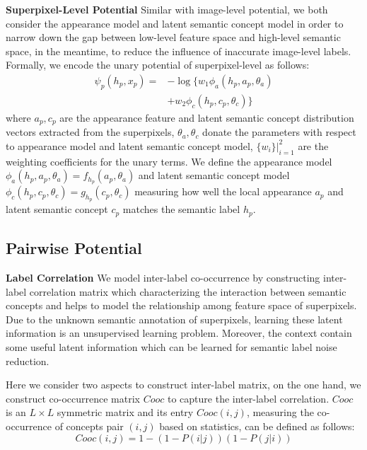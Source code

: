 \textbf{Superpixel-Level Potential}
Similar with image-level potential, we both consider the appearance model and latent semantic concept model in order to narrow down the gap between low-level feature space and high-level semantic space, in the meantime, to reduce the influence of inaccurate image-level labels.
Formally, we encode the unary potential of superpixel-level as follows:
\begin{equation}
    \begin{aligned}
        \psi_{p}(h_p,x_p) = &- \log \big\{ w_1\phi_a(h_p,a_p,\theta_a) \\
        &+ w_2\phi_c(h_p,c_p,\theta_c) \big\}
    \end{aligned}
    \label{eq:local}
\end{equation}
where $a_p, c_p$ are the appearance feature and latent semantic concept distribution vectors extracted from the superpixels, $\theta_a, \theta_c$ donate the parameters with respect to appearance model and latent semantic concept model, $\{w_i\}|_{i=1}^2$ are the weighting coefficients for the unary terms.
We define the appearance model $\phi_a(h_p,a_p,\theta_a) = f_{h_p}(a_p,\theta_a)$ and latent semantic concept model $\phi_c(h_p,c_p,\theta_c) = g_{h_p}(c_p,\theta_c)$ measuring how well the local appearance $a_p$ and latent semantic concept $c_p$ matches the semantic label $h_p$.

\subsection{Pairwise Potential}

\textbf{Label Correlation}
We model inter-label co-occurrence by constructing inter-label correlation matrix which characterizing the interaction between semantic concepts and helps to model the relationship among feature space of superpixels.
Due to the unknown semantic annotation of superpixels, learning these latent information is an unsupervised learning problem.
Moreover, the context contain some useful latent information which can be learned for semantic label noise reduction.

Here we consider two aspects to construct inter-label matrix, on the one hand, we construct co-occurrence matrix $Cooc$ to capture the inter-label correlation. $Cooc$ is an $L \times L$ symmetric matrix and its entry $Cooc(i,j)$, measuring the co-occurrence of concepts pair $(i,j)$ based on statistics, can be defined as follows:
\begin{equation}
    Cooc(i,j) = 1-(1-P(i|j))(1-P(j|i))
\end{equation}

